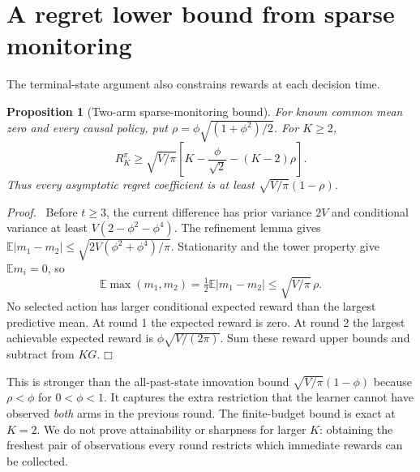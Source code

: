 \documentclass[11pt]{article}
\newtheorem{proposition}[theorem]{Proposition}
\newenvironment{proof}{\par\noindent\textit{Proof.}\ }{\hfill$\mdlgwhtsquare$\par\medskip}
\newcommand{\E}{\mathbb E}
\begin{document}
\section{A regret lower bound from sparse monitoring}
The terminal-state argument also constrains rewards at each decision time.

\begin{proposition}[Two-arm sparse-monitoring bound]
For known common mean zero and every causal policy, put
$\rho=\phi\sqrt{(1+\phi^2)/2}$. For $K\geq2$,
\begin{equation}
\boxed{R_K^\pi\geq\sqrt{V/\pi}
\left[K-\frac\phi{\sqrt2}-(K-2)\rho\right].}
\label{eq:sparse}
\end{equation}
Thus every asymptotic regret coefficient is at least $\sqrt{V/\pi}(1-\rho)$.
\end{proposition}
\begin{proof}
Before $t\geq3$, the current difference has prior variance $2V$ and conditional variance at least $V(2-\phi^2-\phi^4)$. The refinement lemma gives
$\E|m_1-m_2|\leq\sqrt{2V(\phi^2+\phi^4)/\pi}$.
Stationarity and the tower property give $\E m_i=0$, so
\[
\E\max(m_1,m_2)=\tfrac12\E|m_1-m_2|
\leq\sqrt{V/\pi}\,\rho.
\]
No selected action has larger conditional expected reward than the largest predictive mean. At round 1 the expected reward is zero. At round 2 the largest achievable expected reward is $\phi\sqrt{V/(2\pi)}$. Sum these reward upper bounds and subtract from $KG$.
\end{proof}

This is stronger than the all-past-state innovation bound $\sqrt{V/\pi}(1-\phi)$ because $\rho<\phi$ for $0<\phi<1$. It captures the extra restriction that the learner cannot have observed \emph{both} arms in the previous round. The finite-budget bound is exact at $K=2$. We do not prove attainability or sharpness for larger $K$: obtaining the freshest pair of observations every round restricts which immediate rewards can be collected.
\end{document}
